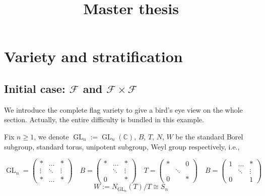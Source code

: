 \documentclass[reqno,11pt]{book}
\numberwithin{equation}{section}
\theoremstyle{plain}
\theoremstyle{plain}
\numberwithin{equation}{section}
\theoremstyle{remark}
\DeclareMathOperator{\GL}{\operatorname{GL}}
\begin{document}
\date{}

\title
{Master thesis
}





\setcounter{tocdepth}{1}
\maketitle
\tableofcontents
\chapter{Variety and stratification}

\section{Initial case: $\mathcal{F}$ and $\mathcal{F} \times \mathcal{F}$}

We introduce the complete flag variety to give a bird's eye view on the whole section. Actually, the entire difficulty is bundled in this example.

Fix $n \geqslant 1$, we denote $\GL_n:=\GL_n(\mathbb{C})$, $B$, $T$, $N$, $W$ be the standard Borel subgroup, standard torus, unipotent subgroup, Weyl group respectively, i.e.,

$$\GL_n= \begin{pmatrix}
* & \dots & * \\
\vdots & \ddots & \vdots \\
* & \dots & * 
\end{pmatrix} \quad
B= \begin{pmatrix}
* & \dots & * \\
 & \ddots & \vdots \\
0 &  & * 
\end{pmatrix} \quad
T= \begin{pmatrix}
* &  & 0 \\
 & \ddots &  \\
0 &  & * 
\end{pmatrix} \quad
B= \begin{pmatrix}
1 & \dots & * \\
 & \ddots & \vdots \\
0 &  & 1
\end{pmatrix} \quad
$$
$$W:= N_{\GL_n}(T)/T \cong S_n$$
\end{document}
